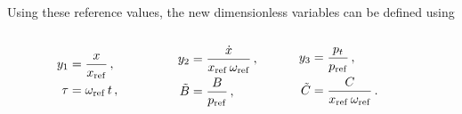 Using these reference values, the new dimensionless variables can be defined using
~
\begin{equation*}
\begin{tabular}{p{3cm} p{3cm} p{3cm}}
    $ \begin{aligned}
        y_1 &= \frac{x}{x_{\rm{ref}}} \, , \\
        \tau &= \omega_{\rm{ref}} \, t \, ,
    \end{aligned} $ &
    $ \begin{aligned}
        y_2 &= \frac{\dot{x}}{x_{\rm{ref}} \, \omega_{\rm{ref}}} \, , \\
        \tilde{B} &= \frac{B}{p_{\rm{ref}}} \, ,
    \end{aligned} $ &
    $ \begin{aligned}
        y_3 &= \frac{p_t}{p_{\rm{ref}}} \, , \\
        \tilde{C} &= \frac{C}{x_{\rm{ref}} \, \omega_{\rm{ref}}} \, .
    \end{aligned} $
\end{tabular}
\end{equation*}

